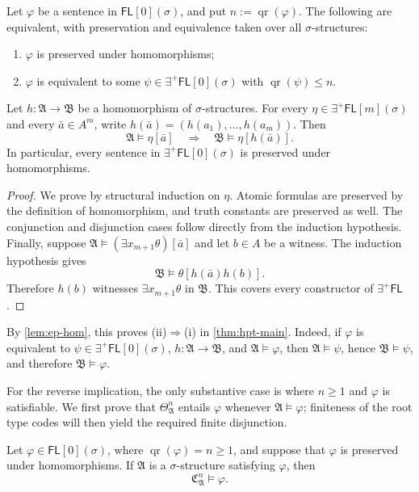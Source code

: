 \documentclass{lmcs}
\newcommand{\FL}{\mathsf{FL}}
\newcommand{\EPFL}{\exists^{+}\!\mathsf{FL}}
\newcommand{\qr}{\operatorname{qr}}
\newcommand{\A}{\mathfrak{A}}
\newcommand{\B}{\mathfrak{B}}
\newcommand{\C}{\mathfrak{C}}
\begin{document}
\begin{thm}\label{thm:hpt-main}
Let $\varphi$ be a sentence in $\FL[0](\sigma)$, and put
$n:=\qr(\varphi)$.  The following are
equivalent, with preservation and equivalence taken over all
$\sigma$-structures:
\begin{enumerate}[label=\textup{(\roman*)}]
  \item $\varphi$ is preserved under homomorphisms;
  \item $\varphi$ is equivalent to some $\psi\in\EPFL[0](\sigma)$ with
  $\qr(\psi)\leq n$.
\end{enumerate}
\end{thm}
\begin{lem}\label{lem:ep-hom}
Let $h:\A\to\B$ be a homomorphism of $\sigma$-structures.  For every
$\eta\in\EPFL[m](\sigma)$ and every $\bar a\in A^m$, write
$h(\bar a)=(h(a_1),\ldots,h(a_m))$.  Then
\[
  \A\models\eta[\bar a]
  \quad\Longrightarrow\quad
  \B\models\eta[h(\bar a)].
\]
In particular, every sentence in $\EPFL[0](\sigma)$ is preserved under
homomorphisms.
\end{lem}

\begin{proof}
We prove by structural induction on $\eta$.  Atomic formulas are preserved by
the definition of homomorphism, and truth constants are preserved as well.
The conjunction and disjunction cases follow directly from the induction
hypothesis.  Finally, suppose
$\A\models(\exists x_{m+1}\theta)[\bar a]$ and let $b\in A$ be a witness.
The induction hypothesis gives
\[
  \B\models\theta[h(\bar a)h(b)].
\]
Therefore $h(b)$ witnesses $\exists x_{m+1}\theta$ in $\B$.  This covers every
constructor of $\EPFL$.
\end{proof}

By \cref{lem:ep-hom}, this proves \textup{(ii)}$\Rightarrow$\textup{(i)} in
\cref{thm:hpt-main}.  Indeed, if $\varphi$ is equivalent to
$\psi\in\EPFL[0](\sigma)$, $h:\A\to\B$, and $\A\models\varphi$, then
$\A\models\psi$, hence $\B\models\psi$, and therefore $\B\models\varphi$.

For the reverse implication, the only substantive case is where $n\geq1$ and
$\varphi$ is satisfiable.  We first prove that $\Theta_{\A}^{n}$ entails
$\varphi$ whenever $\A\models\varphi$; finiteness of the root type codes will
then yield the required finite disjunction.

\begin{lem}\label{lem:canonical-in-class}
Let $\varphi\in\FL[0](\sigma)$, where $\qr(\varphi)=n\geq1$, and suppose
that $\varphi$ is preserved under homomorphisms.  If $\A$ is a
$\sigma$-structure satisfying $\varphi$, then
\[
   \C_{\A}^{n}\models\varphi.
\]
\end{lem}
\end{document}
